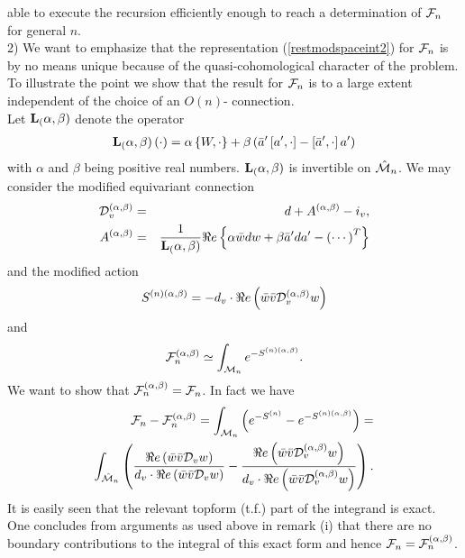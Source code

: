 \documentclass[a4paper,12pt]{article}
\begin{document}
able to execute the recursion efficiently enough to reach a 
determination of ${\cal F}_n$ for general $n$. \\ 
2) We want to emphasize that the representation (\ref{restmodspaceint2}) 
for ${\cal F}_n$ is by no means unique because of the quasi-cohomological 
character of the problem. To illustrate the point we show that the 
result for ${\cal F}_n$ is to a large extent independent of the choice 
of an $O(n)$- connection. \\ 
Let ${\bf L}_(\alpha, \beta)$ denote the operator 
\begin{eqnarray} 
{\bf L}_(\alpha, \beta)\left(\cdot \right) = 
\alpha \left\{W, \cdot \right\} +\beta \left(
\bar{a}'\left[a',\cdot \right]- \left[\bar{a}',\cdot \right]a'\right) 
\label{deformedl}
\end{eqnarray}
with $\alpha$ and $\beta$ being positive real numbers. 
${\bf L}_(\alpha, \beta)$ is invertible on $\hat{{\cal M}}_n$. 
We may consider the modified equivariant connection
\begin{eqnarray}
{\cal D}_v^{(\alpha, \beta)} &=&d+A^{(\alpha, \beta)}-i_v, \nonumber \\
A^{(\alpha, \beta)}&=&\frac{1}{{\bf L}_(\alpha, \beta)}\Re e \left\{
\alpha \bar{w}dw+\beta \bar{a}'da'-\left(\cdots \right)^T
\right\} \nonumber
\end{eqnarray}
and the modified action 
\begin{equation}
S^{(n)(\alpha, \beta)}=-d_v \cdot \Re e\left( \bar{w}\bar{v}
{\cal D}_v^{(\alpha, \beta)}w\right)  \nonumber
\end{equation}
and 
\begin{equation}
{\cal F}_n^{(\alpha, \beta)}\simeq \int_{{\cal M}_n}
e^{-S^{(n)(\alpha, \beta)}}.  \nonumber 
\end{equation}
We want to show that ${\cal F}_n^{(\alpha, \beta)}={\cal F}_n$. 
In fact we have 
\begin{eqnarray}
{\cal F}_n -{\cal F}_n^{(\alpha, \beta)}=\int_{{\cal M}_n} 
\left(e^{-S^{(n)}}-e^{-S^{(n)(\alpha, \beta)}}\right)= \nonumber \\
\int_{{\hat{{\cal M}}_n}} \left(\frac{ \Re e \left(\bar{w}\bar{v}
{\cal D}_v w\right)}{d_v \cdot  \Re e\left(\bar{w}\bar{v}
{\cal D}_v w\right)}-\frac{ \Re e \left(\bar{w}\bar{v}
{\cal D}_v^{(\alpha, \beta)}w\right)}{d_v \cdot \Re e 
\left(\bar{w}\bar{v}{\cal D}_v^{(\alpha, \beta)}w\right)}\right). 
\end{eqnarray}
It is easily seen that the relevant topform (t.f.) part of the 
integrand is exact. 
One concludes from arguments as used above in remark (i) that there 
are no boundary contributions to the integral of this exact form 
and hence ${\cal F}_n ={\cal F}_n^{(\alpha, \beta)}$.
\end{document}
